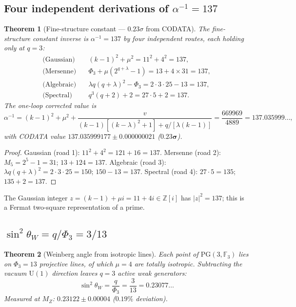 \documentclass[12pt,a4paper]{article}
\newtheorem{theorem}{Theorem}[section]
\theoremstyle{definition}
\newcommand{\PG}{\mathrm{PG}}
\newcommand{\Phithree}{\Phi_3}
\newcommand{\FF}{\mathbb{F}}
\newcommand{\ZZ}{\mathbb{Z}}
\begin{document}
\subsection{Four independent derivations of \texorpdfstring{$\alpha^{-1}=137$}{alpha-1=137}}

\begin{theorem}[Fine-structure constant --- $0.23\sigma$ from CODATA]
\label{thm:alpha}
The fine-structure constant inverse is $\alpha^{-1}=137$ by four
independent routes, each holding \emph{only} at $q=3$:
\begin{align}
  \text{(Gaussian)}    &\quad (k-1)^2+\mu^2 = 11^2+4^2 = 137,
    \label{eq:alpha_gauss}\\[4pt]
  \text{(Mersenne)}    &\quad \Phithree+\mu(2^{q+\lambda}-1)
    = 13+4\times 31 = 137,
    \label{eq:alpha_mersenne}\\[4pt]
  \text{(Algebraic)}   &\quad \lambda q(q+\lambda)^2-\Phithree
    = 2\cdot 3\cdot 25 - 13 = 137,
    \label{eq:alpha_alg}\\[4pt]
  \text{(Spectral)}    &\quad q^3(q+2)+2 = 27\cdot 5+2 = 137.
    \label{eq:alpha_spec}
\end{align}
The one-loop corrected value is
\begin{equation}
  \alpha^{-1} = (k-1)^2+\mu^2 + \frac{v}{(k-1)[(k-\lambda)^2+1]+q/[\lambda(k-1)]}
  = \frac{669969}{4889} = 137.035999\ldots,
  \label{eq:alpha_precise}
\end{equation}
with CODATA value $137.035999177\pm 0.000000021$ ($\mathbf{0.23\sigma}$).
\end{theorem}

\begin{proof}
Gaussian (road 1): $11^2+4^2=121+16=137$.
Mersenne (road 2): $M_5=2^5-1=31$; $13+124=137$.
Algebraic (road 3): $\lambda q(q+\lambda)^2=2\cdot3\cdot25=150$; $150-13=137$.
Spectral (road 4): $27\cdot5=135$; $135+2=137$. \qedhere
\end{proof}

The Gaussian integer $z=(k-1)+\mu i=11+4i\in\ZZ[i]$ has $|z|^2=137$;
this is a Fermat two-square representation of a prime.

\subsection{\texorpdfstring{$\sin^2\theta_W = q/\Phithree = 3/13$}{Weinberg angle}}

\begin{theorem}[Weinberg angle from isotropic lines]
\label{thm:weinberg}
Each point of $\PG(3,\FF_3)$ lies on $\Phithree=13$ projective lines,
of which $\mu=4$ are totally isotropic.  Subtracting the vacuum $\mathrm{U}(1)$
direction leaves $q=3$ active weak generators:
\begin{equation}
  \label{eq:weinberg}
  \boxed{\sin^2\theta_W = \frac{q}{\Phithree} = \frac{3}{13} = 0.23077\ldots}
\end{equation}
Measured at $M_Z$: $0.23122\pm 0.00004$ ($0.19\%$ deviation).
\end{theorem}
\end{document}
